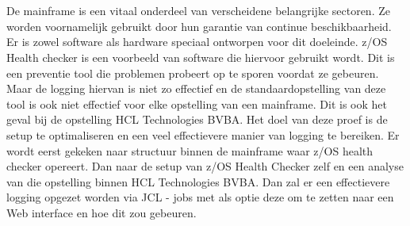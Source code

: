 
%
%

%



\chapter*{}
De mainframe is een vitaal onderdeel van verscheidene belangrijke sectoren. Ze worden voornamelijk gebruikt door hun garantie van continue beschikbaarheid. Er is zowel software als hardware speciaal ontworpen voor dit doeleinde. z/OS Health checker is een voorbeeld van software die hiervoor gebruikt wordt. Dit is een preventie tool die problemen probeert op te sporen voordat ze gebeuren. Maar de logging hiervan is niet zo effectief en de standaardopstelling van deze tool is ook niet effectief voor elke opstelling van een mainframe. Dit is ook het geval bij de opstelling HCL Technologies BVBA. Het doel van deze proef is de setup te optimaliseren en een veel effectievere manier van logging te bereiken. Er wordt eerst gekeken naar structuur binnen de mainframe waar z/OS health checker opereert. Dan naar de setup van z/OS Health Checker zelf en een analyse van die opstelling binnen HCL Technologies BVBA. Dan zal er een effectievere logging opgezet worden via JCL - jobs met als optie deze om te zetten naar een Web interface en hoe dit zou gebeuren.
